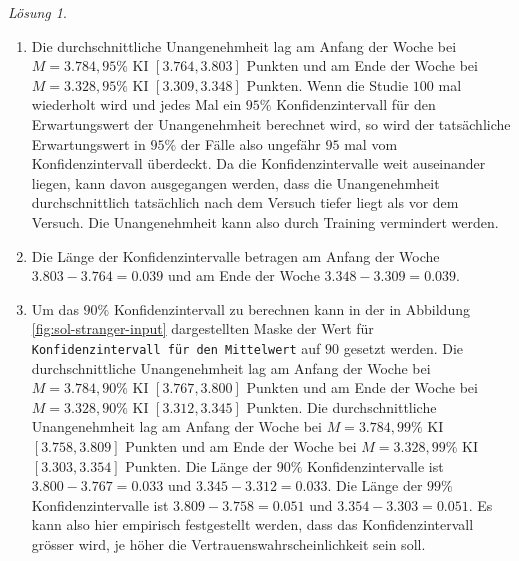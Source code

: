 \documentclass[
]{book}
\providecommand{\tightlist}{%
  \setlength{\itemsep}{0pt}\setlength{\parskip}{0pt}}
\theoremstyle{definition}
\theoremstyle{definition}
\theoremstyle{definition}
\theoremstyle{definition}
\theoremstyle{remark}
\newtheorem*{solution}{Lösung}
\begin{document}
\begin{solution}
\begin{enumerate}
\def\labelenumi{(\alph{enumi})}
\tightlist
\item
  Die durchschnittliche Unangenehmheit lag am Anfang der Woche bei \(M=3.784, 95\%\) KI \([3.764, 3.803]\) Punkten und am Ende der Woche bei \(M=3.328, 95\%\) KI \([3.309, 3.348]\) Punkten. Wenn die Studie \(100\) mal wiederholt wird und jedes Mal ein \(95\%\) Konfidenzintervall für den Erwartungswert der Unangenehmheit berechnet wird, so wird der tatsächliche Erwartungswert in \(95\%\) der Fälle also ungefähr \(95\) mal vom Konfidenzintervall überdeckt. Da die Konfidenzintervalle weit auseinander liegen, kann davon ausgegangen werden, dass die Unangenehmheit durchschnittlich tatsächlich nach dem Versuch tiefer liegt als vor dem Versuch. Die Unangenehmheit kann also durch Training vermindert werden.
\item
  Die Länge der Konfidenzintervalle betragen am Anfang der Woche \(3.803-3.764=0.039\) und am Ende der Woche \(3.348-3.309= 0.039\).
\item
  Um das \(90\%\) Konfidenzintervall zu berechnen kann in der in Abbildung \ref{fig:sol-stranger-input} dargestellten Maske der Wert für \texttt{Konfidenzintervall\ für\ den\ Mittelwert} auf \(90\) gesetzt werden. Die durchschnittliche Unangenehmheit lag am Anfang der Woche bei \(M=3.784, 90\%\) KI \([3.767, 3.800]\) Punkten und am Ende der Woche bei \(M=3.328, 90\%\) KI \([3.312, 3.345]\) Punkten. Die durchschnittliche Unangenehmheit lag am Anfang der Woche bei \(M=3.784, 99\%\) KI \([3.758, 3.809]\) Punkten und am Ende der Woche bei \(M=3.328, 99\%\) KI \([3.303, 3.354]\) Punkten. Die Länge der \(90\%\) Konfidenzintervalle ist \(3.800-3.767=0.033\) und \(3.345-3.312=0.033\). Die Länge der \(99\%\) Konfidenzintervalle ist \(3.809-3.758=0.051\) und \(3.354-3.303=0.051\). Es kann also hier empirisch festgestellt werden, dass das Konfidenzintervall grösser wird, je höher die Vertrauenswahrscheinlichkeit sein soll.
\end{enumerate}

\end{solution}
\end{document}

